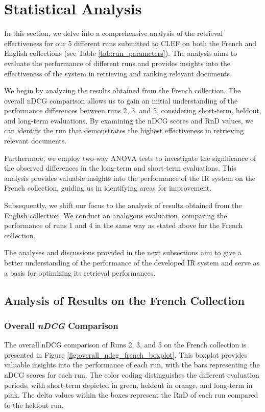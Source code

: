 \section{Statistical Analysis}
\label{sec:analysis}

In this section, we delve into a comprehensive analysis of the retrieval effectiveness for our 5 different runs submitted to \ac{CLEF} on both the French and English collections (see Table \ref{tab:run_parameters}). 
The analysis aims to evaluate the performance of different runs and provides insights into the effectiveness of the system in retrieving and ranking relevant documents.

We begin by analyzing the results obtained from the French collection. 
The overall \ac{nDCG} comparison allows us to gain an initial understanding of the performance differences between runs 2, 3, and 5, considering short-term, heldout, and long-term evaluations. 
By examining the \ac{nDCG} scores and \ac{RnD} values, we can identify the run that demonstrates the highest effectiveness in retrieving relevant documents.

Furthermore, we employ two-way \ac{ANOVA} tests to investigate the significance of the observed differences in the long-term and short-term evaluations. 
This analysis provides valuable insights into the performance of the \ac{IR} system on the French collection, guiding us in identifying areas for improvement.

Subsequently, we shift our focus to the analysis of results obtained from the English collection. 
We conduct an analogous evaluation, comparing the performance of runs 1 and 4 in the same way as stated above for the French collection. 

The analyses and discussions provided in the next subsections aim to give a better understanding of the performance of the developed \ac{IR} system and serve as a basis for optimizing its retrieval performances.


\newpage
\subsection{Analysis of Results on the French Collection}
\enlargethispage{3\baselineskip}
\subsubsection{Overall \textit{nDCG} Comparison}  \label{sec:ndcg_comparison_french}

The overall \ac{nDCG} comparison of Runs 2, 3, and 5 on the French collection is presented in Figure \ref{fig:overall_ndcg_french_boxplot}. 
This boxplot provides valuable insights into the performance of each run, with the bars representing the \ac{nDCG} scores for each run. 
The color coding distinguishes the different evaluation periods, with short-term depicted in green, heldout in orange, and long-term in pink. 
The delta values within the boxes represent the \ac{RnD} of each run compared to the heldout run.


